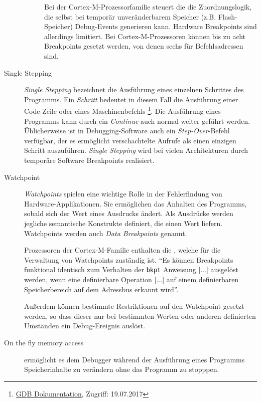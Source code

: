 \begin{description}
\begin{description}
            Bei der Cortex-M-Prozessorfamilie steuert die  die
            Zuordnungslogik, die selbst bei temporär unveränderbarem Speicher (z.B. Flash-Speicher) Debug-Events
            generieren kann\citep[vgl.~Kap.~14.5]{Yiu2013}. Hardware Breakpoints sind allerdings limitiert. Bei
            Cortex-M-Prozessoren können bis zu acht Breakpoints gesetzt werden, von denen sechs für Befehlsadressen sind.
        \end{description}
        \item[Single Stepping]
        \textit{Single Stepping} bezeichnet die Ausführung eines einzelnen Schrittes des Programms. Ein \textit{Schritt}
        bedeutet in diesem Fall die Ausführung einer Code-Zeile oder eines Maschinenbefehls
        \footnote{\href{https://sourceware.org/gdb/onlinedocs/gdb/Continuing-and-Stepping.html}
        {GDB Dokumentation}, Zugriff: 19.07.2017}.
        Die Ausführung eines Programms kann durch ein \textit{Continue} auch normal weiter geführt werden.
        Üblicherweise ist in Debugging-Software auch ein \textit{Step-Over}-Befehl verfügbar, der es ermöglicht
        verschachtelte Aufrufe als einen einzigen Schritt auszuführen.
        \textit{Single Stepping} wird bei vielen Architekturen durch temporäre Software Breakpoints realisiert.
        \item[Watchpoint] \textit{Watchpoints} spielen eine wichtige Rolle in der Fehlerfindung von
        \\Hardware-Applikationen. Sie ermöglichen das Anhalten des Programms, sobald sich der Wert eines Ausdrucks ändert.
        Als Ausdrücke werden jegliche semantische Konstrukte definiert, die einen Wert liefern.
        Watchpoints werden auch \textit{Data Breakpoints} genannt.

        Prozessoren der Cortex\hyp{}M\hyp{}Familie enthalten die , welche für die
        Verwaltung von Watchpoints zuständig ist. ``Es können Breakpoints funktional identisch zum Verhalten der
        \texttt{bkpt} Anweisung [...] ausgelöst werden, wenn eine definierbare Operation [...] auf einem definierbaren Speicherbereich auf dem Adressbus erkannt
        wird''\citep[vgl. Kap. 10.1.3]{Asche2017}.

        Außerdem können bestimmte Restriktionen auf den Watchpoint gesetzt werden, so dass dieser nur bei bestimmten
        Werten oder anderen definierten Umständen ein Debug-Ereignis auslöst.
        \item[On the fly memory access]  ermöglicht es dem Debugger während der Ausführung eines Programms
        Speicherinhalte zu verändern ohne das Programm zu stopppen.
    \end{description}
